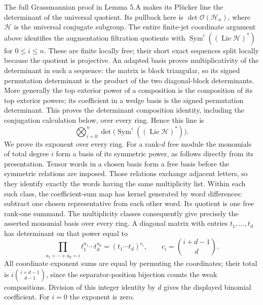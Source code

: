 \documentclass[11pt,a4paper,openany]{report}
\begin{document}
The full Grassmannian proof in Lemma 5.A makes its Plücker line the determinant of the universal quotient. Its pullback here is \(\det\mathcal O(\mathcal H_n)\), where \(\mathcal H\) is the universal conjugate subgroup. The entire finite-jet coordinate argument above identifies the augmentation filtration quotients with \(\operatorname{Sym}^i((\operatorname{Lie}\mathcal H)^*)\) for \(0\leq i\leq n\). These are finite locally free; their short exact sequences split locally because the quotient is projective. An adapted basis proves multiplicativity of the determinant in such a sequence: the matrix is block triangular, so its signed permutation determinant is the product of the two diagonal-block determinants. More generally the top exterior power of a composition is the composition of its top exterior powers; its coefficient in a wedge basis is the signed permutation determinant. This proves the determinant composition identity, including the conjugation calculation below, over every ring. Hence this line is \[
 \bigotimes_{i=0}^n\det\bigl(\operatorname{Sym}^i((\operatorname{Lie}\mathcal H)^*)\bigr).
\] We prove its exponent over every ring. For a rank-\(d\) free module the monomials of total degree \(i\) form a basis of its symmetric power, as follows directly from its presentation. Tensor words in a chosen basis form a free basis before the symmetric relations are imposed. Those relations exchange adjacent letters, so they identify exactly the words having the same multiplicity list. Within each such class, the coefficient-sum map has kernel generated by word differences: subtract one chosen representative from each other word. Its quotient is one free rank-one summand. The multiplicity classes consequently give precisely the asserted monomial basis over every ring. A diagonal matrix with entries \(t_1,\ldots,t_d\) has determinant on that power equal to \[
 \prod_{a_1+\cdots+a_d=i}t_1^{a_1}\cdots t_d^{a_d}
       =(t_1\cdots t_d)^{c_i},\qquad
 c_i=\binom{i+d-1}{d}.
\] All coordinate exponent sums are equal by permuting the coordinates; their total is \(i\binom{i+d-1}{d-1}\), since the separator-position bijection counts the weak compositions. Division of this integer identity by \(d\) gives the displayed binomial coefficient. For \(i=0\) the exponent is zero.
\end{document}
